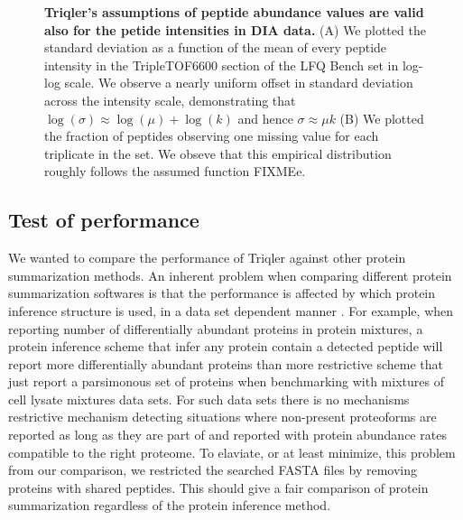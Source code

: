 \documentclass[10pt,letterpaper]{article}
\begin{document}
\begin{figure}[H]
\begin{tabular}{lclc}
    \end{tabular}

    \caption{{\bf Triqler's assumptions of peptide abundance values are valid also for the petide intensities in DIA data.}  (A) We plotted the standard deviation as a function of the mean of every peptide intensity in the TripleTOF6600 section of the LFQ Bench set  in log-log scale. We observe a nearly uniform offset in standard deviation across the intensity scale, demonstrating that $\log(\sigma) \approx \log(\mu) + \log(k)$ and hence   $\sigma \approx \mu k$ (B) We plotted the fraction of peptides observing one missing value for each triplicate in the set. We obseve that this empirical distribution roughly follows the assumed function FIXMEe.}
      \label{fig:assumptions}
\end{figure}



\subsection*{Test of performance}

We wanted to compare the performance of Triqler against other protein summarization methods. An inherent problem when comparing different protein summarization softwares is that the performance is affected by which protein inference structure is used, in a data set dependent manner \cite{serang2012recognizing}. For example, when reporting number of differentially abundant proteins in protein mixtures, a protein inference scheme that infer any protein contain  a detected peptide will report more differentially abundant proteins than more restrictive scheme that just report a parsimonous set of proteins when benchmarking with mixtures of cell lysate mixtures data sets.  For such data sets there is no mechanisms restrictive mechanism detecting situations where non-present proteoforms are reported as long as they are part of and reported with protein abundance rates compatible to the right proteome. To elaviate, or at least minimize, this problem from our comparison, we restricted the searched FASTA files by removing proteins with shared peptides. This should give a fair comparison of protein summarization regardless of the protein inference method.
\end{document}
